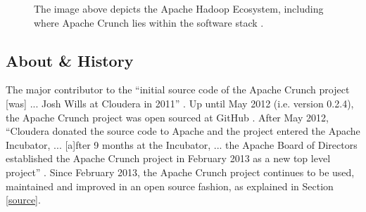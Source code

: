 \documentclass[9pt,twocolumn,twoside]{../../styles/osajnl}
\begin{document}
\begin{figure}[htbp]
\centering
{}
\caption{The image above depicts the Apache Hadoop Ecosystem, including where Apache Crunch lies within the software stack \cite{www-hadoop-ecosystem}.}
\label{fig:hadoop-ecosystem-and-components_3}
\end{figure}

\subsection{About \& History} \label{about}
The major contributor to the ``initial source code of the Apache Crunch project [was] ... Josh Wills at Cloudera in 2011'' \cite{www-crunch-about}.
Up until May 2012 (i.e. version 0.2.4), the Apache Crunch project was open sourced at GitHub \CE \cite{www-crunch-about}.
 After May 2012, ``Cloudera donated the source code to Apache and the project entered the Apache Incubator, ... [a]fter 9 months at the Incubator, ...
the Apache Board of Directors established the Apache Crunch project in February 2013 as a new top level project'' \cite{www-crunch-about}.
 Since February 2013, the Apache Crunch project continues to be used, maintained and improved in an open source fashion, as explained in Section \ref{source}.
\end{document}
